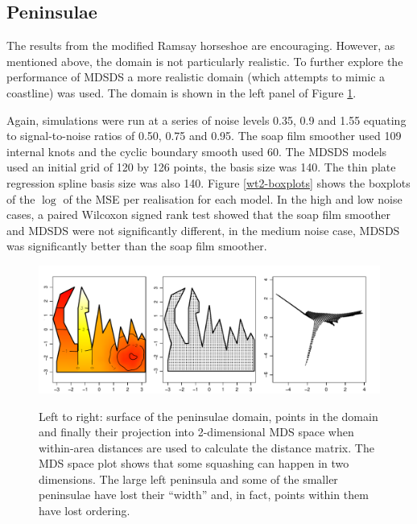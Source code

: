 \documentclass[useAMS, referee]{biom}
\begin{document}
\subsection{Peninsulae}

The results from the modified Ramsay horseshoe are encouraging. However, as mentioned above, the domain is not particularly realistic. To further explore the performance of MDSDS a more realistic domain (which attempts to mimic a coastline) was used. The domain is shown in the left panel of Figure \ref{wt2-plot}.

Again, simulations were run at a series of noise levels 0.35, 0.9 and 1.55 equating to signal-to-noise ratios of 0.50, 0.75 and 0.95. The soap film smoother used 109 internal knots and the cyclic boundary smooth used 60. The MDSDS models used an initial grid of 120 by 126 points, the basis size was 140. The thin plate regression spline basis size was also 140. Figure \ref{wt2-boxplots} shows the boxplots of the $\log$ of the MSE per realisation for each model. In the high and low noise cases, a paired Wilcoxon signed rank test showed that the soap film smoother and MDSDS were not significantly different, in the medium noise case, MDSDS was significantly better than the soap film smoother.


\begin{figure}
\centering
\includegraphics[width=\textwidth]{examples/wt2/wt2-plot.pdf} \\
\caption{Left to right: surface of the peninsulae domain, points in the domain and finally their projection into 2-dimensional MDS space when within-area distances are used to calculate the distance matrix. The MDS space plot shows that some squashing can happen in two dimensions. The large left peninsula and some of the smaller peninsulae have lost their ``width'' and, in fact, points within them have lost ordering.}
\label{wt2-plot}
\end{figure}
\end{document}
